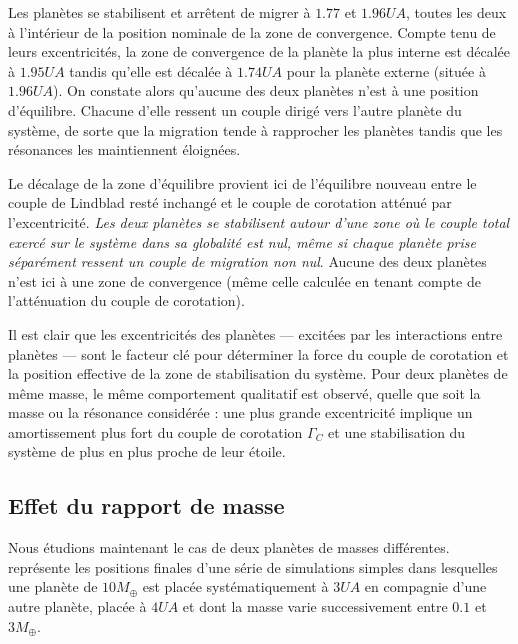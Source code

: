 Les planètes se stabilisent et arrêtent de migrer à $1.77$ et $1.96\unit{UA}$, toutes les deux à l'intérieur de la position nominale de la zone de convergence. Compte tenu de leurs excentricités, la zone de convergence de la planète la plus interne est décalée à $1.95\unit{UA}$ tandis qu'elle est décalée à $1.74\unit{UA}$ pour la planète externe (située à $1.96\unit{UA}$). On constate alors qu'aucune des deux planètes n'est à une position d'équilibre. Chacune d'elle ressent un couple dirigé vers l'autre planète du système, de sorte que la migration tende à rapprocher les planètes tandis que les résonances les maintiennent éloignées.

Le décalage de la zone d'équilibre provient ici de l'équilibre nouveau entre le couple de Lindblad resté inchangé et le couple de corotation atténué par l'excentricité. \emph{Les deux planètes se stabilisent autour d'une zone où le couple total exercé sur le système dans sa globalité est nul, même si chaque planète prise séparément ressent un couple de migration non nul}. Aucune des deux planètes n'est ici à une zone de convergence (même celle calculée en tenant compte de l'atténuation du couple de corotation). 

Il est clair que les excentricités des planètes --- excitées par les interactions entre planètes --- sont le facteur clé pour déterminer la force du couple de corotation et la position effective de la zone de stabilisation du système. Pour deux planètes de même masse, le même comportement qualitatif est observé, quelle que soit la masse ou la résonance considérée : une plus grande excentricité implique un amortissement plus fort du couple de corotation $\Gamma_C$ et une stabilisation du système de plus en plus proche de leur étoile. 

\subsection{Effet du rapport de masse}\label{sec:mass-ratio-effect}
Nous étudions maintenant le cas de deux planètes de masses différentes.  représente les
positions finales d'une série de simulations simples dans lesquelles une planète de $10\unit{M_\oplus}$ est placée
systématiquement à $3\unit{UA}$ en compagnie d'une autre planète, placée à $4\unit{UA}$ et dont la masse varie successivement
entre $0.1$ et $3\unit{M_\oplus}$. 

